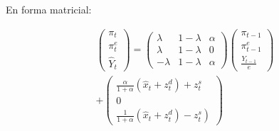 \documentclass[11pt]{beamer}
\begin{document}
		
\begin{frame}
		En forma matricial:
	
	
	\begin{gather*}
		\left(\begin{array}{c}
			\pi_{t} \\
			\pi_{t}^{e} \\
			\widehat{Y}_{t}
		\end{array}\right)=\left(\begin{array}{ccc}
			\lambda & 1-\lambda & \alpha \\
			\lambda & 1-\lambda & 0 \\
			-\lambda & 1-\lambda & \alpha
		\end{array}\right)\left(\begin{array}{c}
			\pi_{t-1} \\
			\pi_{t-1}^{e} \\
			\frac{Y_{t-1}}{e}
		\end{array}\right) \\
		+\left(\begin{array}{l}
			\frac{\alpha}{1+\alpha}\left(\widehat{x}_{t}+z_{t}^{d}\right)+z_{t}^{s} \\
			0 \\
			\left.\frac{1}{1+\alpha}\left(\widehat{x}_{t}+z_{t}^{d}\right)-z_{t}^{s}\right)
		\end{array}\right) \tag{9}
	\end{gather*}
\end{frame}		
	

	
\end{document}
